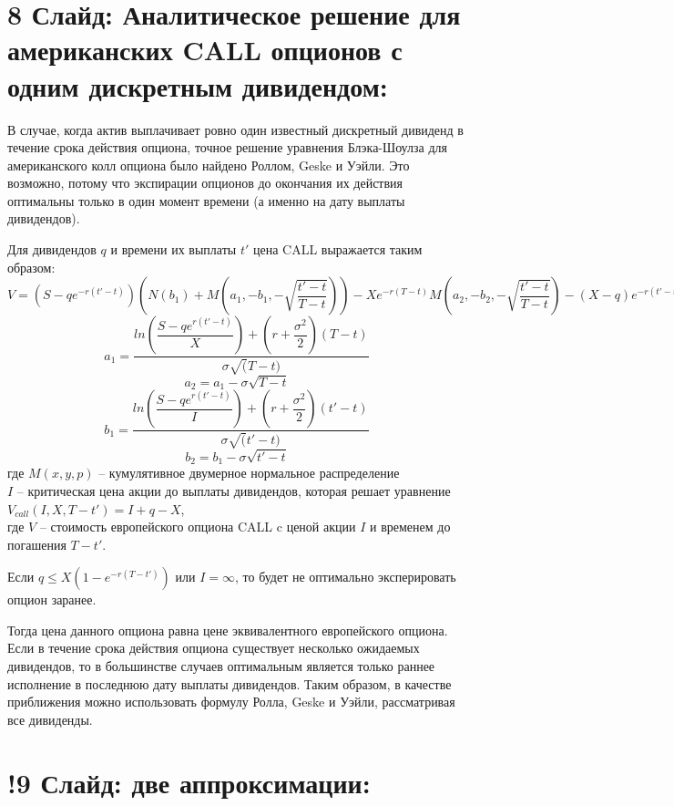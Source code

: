 \documentclass[a4paper]{article}
\begin{document}
\section*{8 Слайд: Аналитическое решение для американских CALL опционов с одним дискретным дивидендом:}
В случае, когда актив выплачивает ровно один известный дискретный дивиденд в течение срока действия опциона, точное решение уравнения Блэка-Шоулза для американского колл опциона было найдено Роллом, Geske и Уэйли. Это возможно, потому что экспирации опционов до окончания их действия оптимальны только в один момент времени (а именно на дату выплаты дивидендов).

Для дивидендов $q$ и времени их выплаты $t'$ цена CALL выражается таким образом:
$V = \left(S - qe^{-r (t' - t)} \right) \left( N(b_1) + M \left( a_1, -b_1, - \sqrt{ \dfrac{t' - t}{T - t}} \right) \right) - Xe^{-r (T - t)}  M \left( a_2, -b_2, - \sqrt{\dfrac{t' - t}{T - t}} \right) - (X - q) e^{-r (t' - t)} N(b_2)$
\[a_1 = \dfrac{ln \left( \dfrac{S - qe^{r(t' - t)}}{X}\right) + (r + \dfrac{\sigma^2}{2}) (T-t)}{\sigma \sqrt(T - t)}\]
\[a_2 = a_1 - \sigma \sqrt{T - t}\]
\[b_1 = \dfrac{ln \left( \dfrac{S - qe^{r(t' - t)}}{I}\right) + (r + \dfrac{\sigma^2}{2}) (t'-t)}{\sigma \sqrt(t' - t)}\]
\[b_2 = b_1 - \sigma \sqrt{t' - t}\]
где $M(x,y,p)$ -- кумулятивное двумерное нормальное распределение \\
$I$ -- критическая цена акции до выплаты дивидендов, которая решает уравнение $V_{call} (I, X, T - t') = I + q - X$, \\
где $V$ -- стоимость европейского опциона CALL c ценой акции $I$ и временем до погашения $T - t'$.

Если $q \leq X (1 - e ^{-r (T - t')})$ или $I = \infty$, то будет не оптимально эксперировать опцион заранее.

Тогда цена данного опциона равна цене эквивалентного европейского опциона. Если в течение срока действия опциона существует несколько ожидаемых дивидендов, то в большинстве случаев оптимальным является только раннее исполнение в последнюю дату выплаты дивидендов. Таким образом, в качестве приближения можно использовать формулу Ролла, Geske и Уэйли, рассматривая все дивиденды.
\section*{!9 Слайд: две аппроксимации:}
\end{document}
